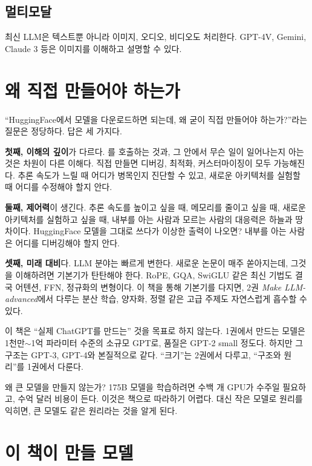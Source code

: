 \subsection{멀티모달}
최신 LLM은 텍스트뿐 아니라 이미지, 오디오, 비디오도 처리한다. GPT-4V, Gemini, Claude 3 등은 이미지를 이해하고 설명할 수 있다.

\section{왜 직접 만들어야 하는가}

``HuggingFace에서 모델을 다운로드하면 되는데, 왜 굳이 직접 만들어야 하는가?''라는 질문은 정당하다. 답은 세 가지다.

\textbf{첫째, 이해의 깊이}가 다르다. 를 호출하는 것과, 그 안에서 무슨 일이 일어나는지 아는 것은 차원이 다른 이해다. 직접 만들면 디버깅, 최적화, 커스터마이징이 모두 가능해진다. 추론 속도가 느릴 때 어디가 병목인지 진단할 수 있고, 새로운 아키텍처를 실험할 때 어디를 수정해야 할지 안다.

\textbf{둘째, 제어력}이 생긴다. 추론 속도를 높이고 싶을 때, 메모리를 줄이고 싶을 때, 새로운 아키텍처를 실험하고 싶을 때, 내부를 아는 사람과 모르는 사람의 대응력은 하늘과 땅 차이다. HuggingFace 모델을 그대로 쓰다가 이상한 출력이 나오면? 내부를 아는 사람은 어디를 디버깅해야 할지 안다.

\textbf{셋째, 미래 대비}다. LLM 분야는 빠르게 변한다. 새로운 논문이 매주 쏟아지는데, 그것을 이해하려면 기본기가 탄탄해야 한다. RoPE, GQA, SwiGLU 같은 최신 기법도 결국 어텐션, FFN, 정규화의 변형이다. 이 책을 통해 기본기를 다지면, 2권 \textit{Make LLM-advanced}에서 다루는 분산 학습, 양자화, 정렬 같은 고급 주제도 자연스럽게 흡수할 수 있다.

\begin{warnbox}[이 책의 한계]
이 책은 ``실제 ChatGPT를 만드는'' 것을 목표로 하지 않는다. 1권에서 만드는 모델은 1천만$\sim$1억 파라미터 수준의 소규모 GPT로, 품질은 GPT-2 small 정도다. 하지만 그 구조는 GPT-3, GPT-4와 본질적으로 같다. ``크기''는 2권에서 다루고, ``구조와 원리''를 1권에서 다룬다.

왜 큰 모델을 만들지 않는가? 175B 모델을 학습하려면 수백 개 GPU가 수주일 필요하고, 수억 달러 비용이 든다. 이것은 책으로 따라하기 어렵다. 대신 작은 모델로 원리를 익히면, 큰 모델도 같은 원리라는 것을 알게 된다.
\end{warnbox}

\section{이 책이 만들 모델}

